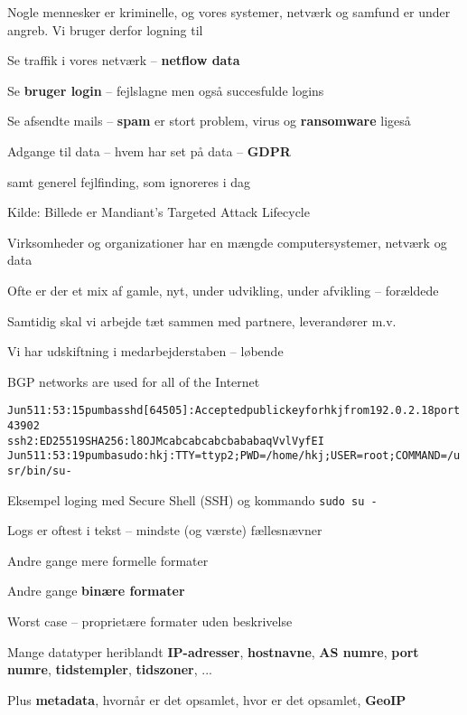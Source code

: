 \documentclass[Screen16to9,17pt]{foils}
\begin{document}
Nogle mennesker er kriminelle, og vores systemer, netværk og samfund er under angreb. Vi bruger derfor logning til
\begin{list2}
\item Se traffik i vores netværk -- {\bf netflow data}
\item Se {\bf bruger login} -- fejlslagne men også succesfulde logins
\item Se afsendte mails -- {\bf spam} er stort problem, {virus og \bf ransomware} ligeså
\item Adgange til data -- hvem har set på data -- {\bf GDPR}
\item samt generel fejlfinding, som ignoreres i dag
\end{list2}

Kilde: Billede er Mandiant’s Targeted Attack Lifecycle





\begin{list2}
\item Virksomheder og organizationer har en mængde computersystemer, netværk og data
\item Ofte er der et mix af gamle, nyt, under udvikling, under afvikling -- forældede
\item Samtidig skal vi arbejde tæt sammen med partnere, leverandører m.v.
\item Vi har udskiftning i medarbejderstaben -- løbende
\end{list2}




\centerline{BGP networks are used for all of the Internet}



\begin{alltt}\small
Jun  5 11:53:15 pumba sshd[64505]: Accepted publickey for hkj from 192.0.2.18 port 43902
ssh2: ED25519 SHA256:l8OJMcabcabcabcbababaqVvlVyfEI
Jun  5 11:53:19 pumba sudo:      hkj : TTY=ttyp2 ; PWD=/home/hkj ; USER=root ; COMMAND=/usr/bin/su -
\end{alltt}
Eksempel loging med Secure Shell (SSH) og kommando \verb+sudo su -+

\begin{list2}
\item Logs er oftest i tekst -- mindste (og værste) fællesnævner
\item Andre gange mere formelle formater
\item Andre gange {\bf binære formater}
\item Worst case -- proprietære formater uden beskrivelse
\item Mange datatyper heriblandt {\bf IP-adresser}, {\bf hostnavne}, {\bf AS numre}, {\bf port numre}, {\bf tidstempler}, {\bf tidszoner}, ...
\item Plus {\bf metadata}, hvornår er det opsamlet, hvor er det opsamlet, {\bf GeoIP}
\end{list2}
\end{document}
